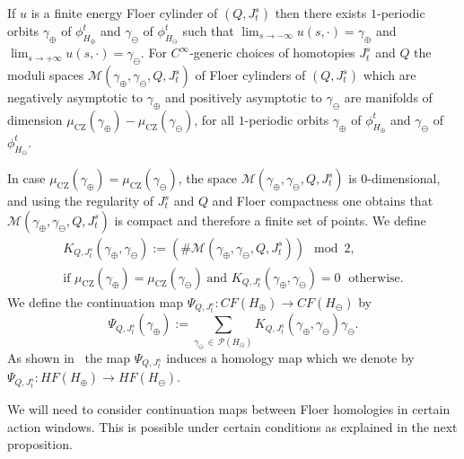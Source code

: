 \documentclass[AHL,Unicode,longabstracts,published]{cedram}
\newcommand{\rCZ}{\mathrm{CZ}}
\newcommand{\clP}{\mathcal{P}}
\newcommand{\clM}{\mathcal{M}}
\begin{document}
If $u$ is a finite energy Floer cylinder of $(Q,J^s_t)$ then there exists $1$-periodic orbits $\gamma_\oplus$ of $\phi^t_{H_\oplus}$ and $\gamma_\ominus$ of $\phi^t_{H_\ominus}$ such that $\lim_{s \to -\infty} u(s, \cdot) = \gamma_\oplus$ and $\lim_{s \to +\infty} u(s, \cdot) = \gamma_\ominus$. For $C^\infty$-generic choices of homotopies $J^s_t$ and $Q$ the moduli spaces $\clM(\gamma_\oplus, \gamma_\ominus, Q,J^s_t)$ of Floer cylinders of $(Q,J^s_t)$ which are negatively asymptotic to $\gamma_\oplus$ and positively asymptotic to $\gamma_\ominus $ are manifolds of dimension $\mu_{\rCZ}(\gamma_\oplus) - \mu_{\rCZ}(\gamma_\ominus)$, for all $1$-periodic orbits $\gamma_\oplus$ of $\phi^t_{H_\oplus}$ and $\gamma_\ominus$ of $\phi^t_{H_\ominus}$.

In case $\mu_{\rCZ}(\gamma_\oplus) = \mu_{\rCZ}(\gamma_\ominus)$, the space $\clM(\gamma_\oplus, \gamma_\ominus, Q,J^s_t)$ is $0$-dimensional, and using the regularity of $J^s_t$ and $Q$ and Floer compactness one obtains that $\clM(\gamma_\oplus, \gamma_\ominus, Q,J^s_t)$ is compact and therefore a finite set of points. We define
\begin{multline*}
K_{Q,J^s_t}(\gamma_\oplus, \gamma_\ominus):= (\# \clM(\gamma_\oplus, \gamma_\ominus, Q,J^s_t))\mod 2,\\
 \text{if }\mu_{\rCZ}(\gamma_\oplus) = \mu_{\rCZ}(\gamma_\ominus)\; \text{and }K_{Q,J^s_t}(\gamma_\oplus, \gamma_\ominus)=0\;\text{ otherwise}.
\end{multline*}
We define the continuation map $\Psi_{Q,J^s_t}: CF(H_\oplus) \to CF(H_\ominus)$ by
\begin{equation}\label{eq:continuation}
\Psi_{Q,J^s_t}(\gamma_\oplus) := \sum_{\gamma_\ominus\, \in\,\clP(H_\ominus)} K_{Q,J^s_t}(\gamma_\oplus,\gamma_{\ominus}) \gamma_{\ominus}.
\end{equation}
As shown in~\cite{AD} the map $\Psi_{Q,J^s_t}$ induces a homology map which we denote by $\Psi_{Q,J^s_t}: HF(H_\oplus) \to HF(H_\ominus)$.


We will need to consider continuation maps between Floer homologies in certain action windows. This is possible under certain conditions as explained in the next proposition.
\end{document}
